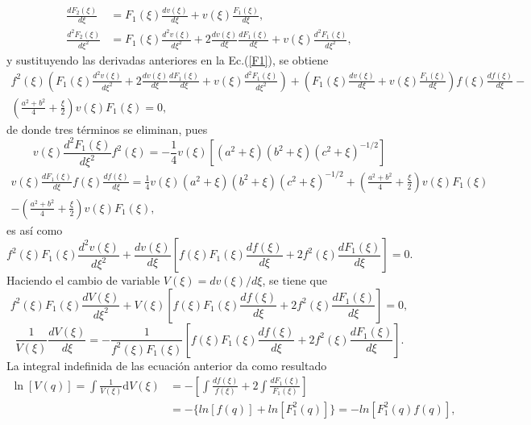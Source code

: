 \begin{align*}
    \frac{dF_2(\xi)}{d\xi}&=F_1(\xi)\frac{dv(\xi)}{d\xi}+v(\xi)\frac{F_1(\xi)}{d\xi},\\
    \frac{d^2F_2(\xi)}{d\xi^2}&=F_1(\xi)\frac{d^2v(\xi)}{d\xi^2}+2\frac{dv(\xi)}{d\xi}\frac{dF_1(\xi)}{d\xi}+v(\xi)\frac{d^2F_1(\xi)}{d\xi^2},
\end{align*}
y sustituyendo las derivadas anteriores en la Ec.(\ref{F1}), se obtiene
\begin{multline}
    f^2(\xi)\left(F_1(\xi)\frac{d^2v(\xi)}{d\xi^2}+2\frac{dv(\xi)}{d\xi}\frac{dF_1(\xi)}{d\xi}+v(\xi)\frac{d^2F_1(\xi)}{d\xi^2}\right)+\left(F_1(\xi)\frac{dv(\xi)}{d\xi}+v(\xi)\frac{F_1(\xi)}{d\xi}\right)f(\xi)\frac{df(\xi)}{d\xi}-
    \\ \left(\frac{a^2+b^2}{4}+\frac{\xi}{2}\right)v(\xi)F_1(\xi)=0,
\end{multline}
de donde tres términos se eliminan, pues
\begin{equation*}
    v(\xi)\frac{d^2F_1(\xi)}{d\xi^2}f^2(\xi)=-\frac{1}{4}v(\xi)[(a^2+\xi)(b^2+\xi)(c^2+\xi)^{-1/2}]
\end{equation*}
\begin{multline*}
    v(\xi)\frac{dF_1(\xi)}{d\xi}f(\xi)\frac{df(\xi)}{d\xi}=\frac{1}{4}v(\xi)(a^2+\xi)(b^2+\xi)(c^2+\xi)^{-1/2}+\left(\frac{a^2+b^2}{4}+\frac{\xi}{2}\right)v(\xi)F_1(\xi)\\-\left(\frac{a^2+b^2}{4}+\frac{\xi}{2}\right)v(\xi)F_1(\xi),
\end{multline*}
es así como
\begin{equation*}
    f^2(\xi)F_1(\xi)\frac{d^2v(\xi)}{d\xi^2}+\frac{dv(\xi)}{d\xi}\left[f(\xi)F_1(\xi)\frac{df(\xi)}{d\xi}+2f^2(\xi)\frac{dF_1(\xi)}{d\xi}\right]=0.
\end{equation*}
Haciendo el cambio de variable $V(\xi)=dv(\xi)/d\xi$, se tiene que
\begin{equation*}
    f^2(\xi)F_1(\xi)\frac{dV(\xi)}{d\xi^2}+V(\xi)\left[f(\xi)F_1(\xi)\frac{df(\xi)}{d\xi}+2f^2(\xi)\frac{dF_1(\xi)}{d\xi}\right]=0,    
\end{equation*}
\begin{equation*}
    \frac{1}{V(\xi)}\frac{dV(\xi)}{d\xi}=-\frac{1}{f^2(\xi)F_1(\xi)}\left[f(\xi)F_1(\xi)\frac{df(\xi)}{d\xi}+2f^2(\xi)\frac{dF_1(\xi)}{d\xi}\right].
\end{equation*}
 La integral indefinida de las ecuación anterior da como resultado
\begin{align}
    \ln[V(q)]=\int\frac{1}{V(\xi)}\text{d}V(\xi)&=-\left[\int \frac{df(\xi)}{f(\xi)}+2\int \frac{dF_1(\xi)}{F_1(\xi)}\right]\nonumber\\
    &=-\{ln[f(q)]+ln[F_1^2(q)]\}=-ln[F_1^2(q)f(q)],
\end{align}
